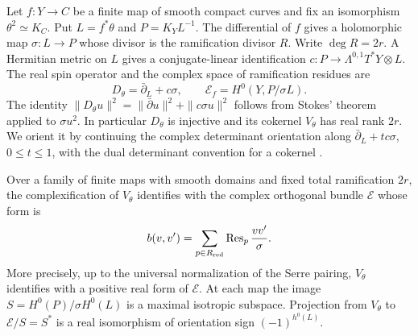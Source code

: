 Let \(f:Y\to C\) be a finite map of smooth compact curves and fix an
isomorphism \(\theta^2\simeq K_C\). Put \(L=f^*\theta\) and
\(P=K_YL^{-1}\). The differential of \(f\) gives a holomorphic map
\(\sigma:L\to P\) whose divisor is the ramification divisor \(R\).
Write \(\deg R=2r\). A Hermitian metric on \(L\) gives a conjugate-linear
identification \(c:P\to\Lambda^{0,1}T^*Y\otimes L\). The real spin
operator and the complex space of ramification residues are
\begin{equation}\label{p8-eq:residue-operator}
 D_\theta=\bar\partial_L+c\sigma,\qquad
 \mathcal E_f=H^0(Y,P/\sigma L).
\end{equation}
The identity
\(\|D_\theta u\|^2=\|\bar\partial u\|^2+\|c\sigma u\|^2\)
follows from Stokes' theorem applied to \(\sigma u^2\). In particular
\(D_\theta\) is injective and its cokernel \(V_\theta\) has real rank
\(2r\). We orient it by continuing the complex determinant orientation
along \(\bar\partial_L+t c\sigma\), \(0\le t\le1\), with the dual
determinant convention for a cokernel \cite[\S12]{lpob}.

\begin{theorem}\label{p8-thm:residue}
Over a family of finite maps with smooth domains and fixed total
ramification \(2r\), the complexification of \(V_\theta\) identifies
with the complex orthogonal bundle \(\mathcal E\) whose form is
\begin{equation}\label{p8-eq:ramification-residues}
 b(v,v')=\sum_{p\in R_{\rm red}}\operatorname{Res}_p
                         \frac{vv'}{\sigma}.
\end{equation}
More precisely, up to the universal normalization of the Serre pairing,
\(V_\theta\) identifies with a positive real form of \(\mathcal E\).
At each map the image \(S=H^0(P)/\sigma H^0(L)\) is a maximal
isotropic subspace. Projection from \(V_\theta\) to
\(\mathcal E/S=S^*\) is a real isomorphism of orientation sign
\((-1)^{h^0(L)}\).
\end{theorem}

